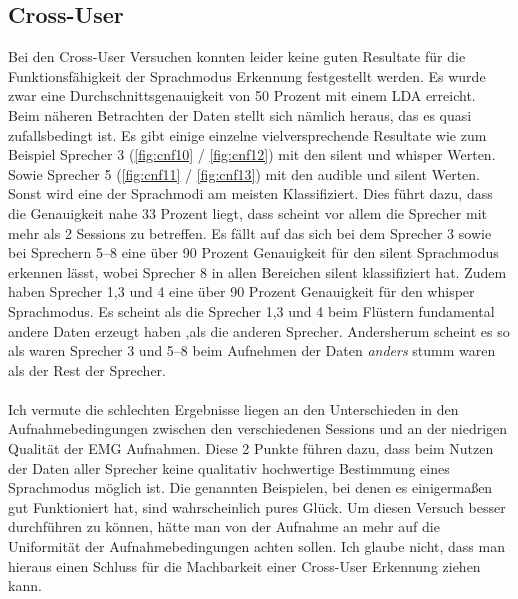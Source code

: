 \subsection{Cross-User}
Bei den Cross-User Versuchen konnten leider keine guten Resultate für die Funktionsfähigkeit der Sprachmodus Erkennung festgestellt werden. Es wurde zwar eine Durchschnittsgenauigkeit von 50 Prozent mit einem LDA erreicht. Beim näheren Betrachten der Daten stellt sich nämlich heraus, das es quasi zufallsbedingt ist. Es gibt einige einzelne vielversprechende Resultate wie zum Beispiel Sprecher 3 (\ref{fig:cnf10} / \ref{fig:cnf12}) mit den silent und whisper Werten. Sowie Sprecher 5 (\ref{fig:cnf11} / \ref{fig:cnf13}) mit den audible und silent Werten. Sonst wird eine der Sprachmodi am meisten Klassifiziert. Dies führt dazu, dass die Genauigkeit nahe 33 Prozent liegt, dass scheint vor allem die Sprecher mit mehr als 2 Sessions zu betreffen. Es fällt auf das sich bei dem Sprecher 3 sowie bei Sprechern 5–8 eine über 90 Prozent Genauigkeit für den silent Sprachmodus erkennen lässt, wobei Sprecher 8 in allen Bereichen silent klassifiziert hat. Zudem haben Sprecher 1,3 und 4 eine über 90 Prozent Genauigkeit für den whisper Sprachmodus. Es scheint als die Sprecher 1,3 und 4 beim Flüstern fundamental andere Daten erzeugt haben ,als die anderen Sprecher. Andersherum scheint es so als waren Sprecher 3 und 5–8 beim Aufnehmen der Daten \textit{anders} stumm waren als der Rest der Sprecher. 

\paragraph{}
Ich vermute die schlechten Ergebnisse liegen an den Unterschieden in den Aufnahmebedingungen zwischen den verschiedenen Sessions und an der niedrigen Qualität der EMG Aufnahmen. Diese 2 Punkte führen dazu, dass beim Nutzen der Daten aller Sprecher keine qualitativ hochwertige Bestimmung eines Sprachmodus möglich ist. Die genannten Beispielen, bei denen es einigermaßen gut Funktioniert hat, sind wahrscheinlich pures Glück. Um diesen Versuch besser durchführen zu können, hätte man von der Aufnahme an mehr auf die Uniformität der Aufnahmebedingungen achten sollen.
Ich glaube nicht, dass man hieraus einen Schluss für die Machbarkeit einer Cross-User Erkennung ziehen kann.

